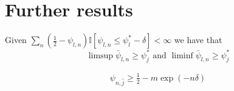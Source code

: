 \section{Further results}

\begin{lemma}\label{lemma:limsup_undersampling}
  Given $\sum_n(\frac{1}{2} - \psi_{l, n}) \mathbb{I}[\psi_{l, n} \leq \psi_l^*
  - \delta] < \infty$ we have that
  \[\limsup \bar{\psi}_{l, n} \geq \psi_j^* \text{ and } \liminf \bar{\psi}_{l,
  n} \geq \psi_j^*\]
\end{lemma}

\begin{lemma}\label{lemma:psi_undersampled}
  \begin{align}
    \psi_{n, \hat{j}} \geq \frac{1}{2} - m\exp(-n \delta)
  \end{align}
\end{lemma}

